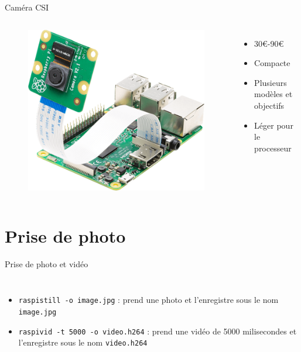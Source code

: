 \documentclass[aspectratio=169,xcolor=dvipsnames]{beamer}
\begin{document}
\begin{frame}{Caméra CSI}
    \begin{columns}[c] %

        \begin{figure}
            \includegraphics[width=0.6\linewidth]{2/camera-csi.png}
        \end{figure}

        \begin{itemize}
            \item 30€-90€
            \item Compacte
            \item Plusieurs modèles et objectifs
            \item Léger pour le processeur
        \end{itemize}

    \end{columns}
\end{frame}


\section{Prise de photo}

\begin{frame}{Prise de photo et vidéo}
    \begin{columns}[c] %

        \begin{itemize}
            \item \texttt{raspistill -o image.jpg} : prend une photo et l'enregistre sous le nom \texttt{image.jpg}
            \item \texttt{raspivid -t 5000 -o video.h264} : prend une vidéo de 5000 milisecondes et l'enregistre sous le nom \texttt{video.h264}
        \end{itemize}

    \end{columns}
\end{frame}
\end{document}
